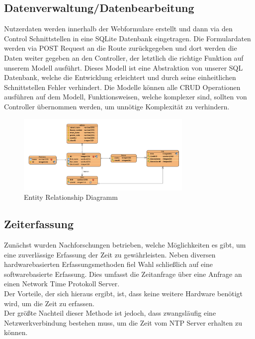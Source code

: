 \documentclass[../main.tex]{subfiles}
\begin{document}
\subsection{Datenverwaltung/Datenbearbeitung}

Nutzerdaten werden innerhalb der Webformulare erstellt und dann via den Control Schnittstellen in eine SQLite Datenbank eingetragen. Die Formulardaten werden via POST Request an die Route zurückgegeben und dort werden die Daten weiter gegeben an den Controller, der letztlich die richtige Funktion auf unserem Modell ausführt. Dieses Modell ist eine Abstraktion von unserer SQL Datenbank, welche die Entwicklung erleichtert und durch seine einheitlichen Schnittstellen Fehler verhindert. Die Modelle können alle CRUD Operationen ausführen auf dem Modell, Funktionsweisen, welche komplexer sind, sollten von Controller übernommen werden, um unnötige Komplexität zu verhindern.

\begin{figure}[!ht]
    \centering
    \includegraphics[width=0.75\textwidth]{images/Datenbank Modell.png}
    \caption{Entity Relationship Diagramm}
    \label{fig:ER}
    \centering
\end{figure}

\subsection{Zeiterfassung} \label{ZeitwerfassungEntwicklung}
Zunächst wurden Nachforschungen betrieben, welche Möglichkeiten es gibt, um eine zuverlässige Erfassung der Zeit zu gewährleisten. Neben diversen hardwarebasierten Erfassungsmethoden fiel Wahl schließlich auf eine softwarebasierte Erfassung. Dies umfasst die Zeitanfrage über eine Anfrage an einen Network Time Protokoll Server.\\
Der Vorteile, der sich hieraus ergibt, ist, dass keine weitere Hardware benötigt wird, um die Zeit zu erfassen.\\ 
Der größte Nachteil dieser Methode ist jedoch, dass zwangsläufig eine Netzwerkverbindung bestehen muss, um die Zeit vom NTP Server erhalten zu können.
\end{document}
